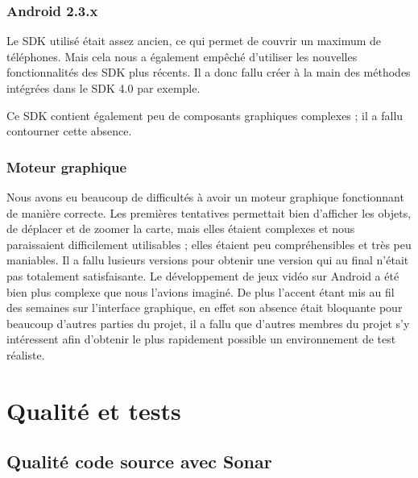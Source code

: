 \documentclass{report}
\begin{document}
\subsubsection{Android 2.3.x}

Le SDK utilisé était assez ancien, ce qui permet de couvrir un maximum
de téléphones. Mais cela nous a également empêché d’utiliser les
nouvelles  fonctionnalités des SDK plus récents. Il a donc fallu créer
à la main des méthodes intégrées dans le SDK 4.0 par exemple.

Ce SDK contient également peu de composants graphiques complexes ; il a
fallu contourner cette absence.

\subsubsection{Moteur graphique}

Nous avons eu beaucoup de difficultés à avoir un moteur graphique
fonctionnant de manière correcte. Les premières tentatives permettait
bien d’afficher les objets, de déplacer et de zoomer la carte, mais
elles étaient complexes et nous paraissaient difficilement utilisables ;
elles étaient peu compréhensibles et très peu maniables. Il a fallu
lusieurs versions pour obtenir une version qui au final n’était pas
totalement satisfaisante. Le développement de jeux vidéo sur Android a
été bien plus complexe que nous l’avions imaginé. De plus l’accent étant
mis au fil des semaines sur l’interface graphique, en effet son absence
était bloquante pour beaucoup d’autres parties du projet, il a fallu que
d’autres membres du projet s’y intéressent afin d’obtenir le plus
rapidement possible un environnement de test réaliste.
\newpage

\section{Qualité et tests}

\subsection{Qualité code source avec Sonar}
\end{document}
